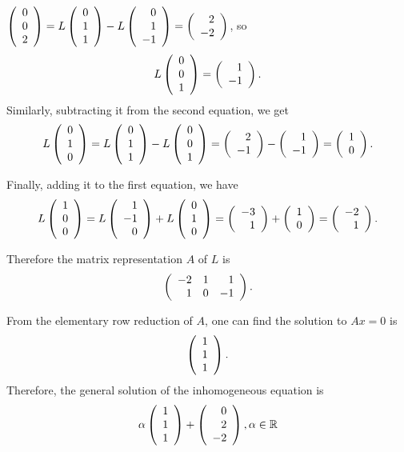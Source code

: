 \documentclass{ximera}
\begin{document}
\begin{exercise}
\begin{solution}
\begin{enumeratea}
\end{enumeratea}



\soln 

\begin{enumeratea}
\item  $\Matrix{ 0\\0\\2 }=L\Matrix{ 0\\1\\1}-L\Matrix{0\\1\\-1}=\Matrix{2\\-2 }$, so 
\[
L\Matrix{0\\0\\1}=\Matrix{1\\-1}.
\]
Similarly, subtracting it from the second equation, we get 
\[
L\Matrix{0\\1\\0}=L\Matrix{ 0\\1\\1}-L\Matrix{0\\0\\1}=\Matrix{2\\-1}-\Matrix{1\\-1}=\Matrix{1\\0 }.
\]

Finally, adding it to the first equation, we have 
\[
L\Matrix{1\\0\\0}=L\Matrix{1\\-1\\0}+L\Matrix{0\\1\\0}=\Matrix{ -3\\1}+\Matrix{1\\0}=\Matrix{-2\\1}.
\]

Therefore the matrix representation $A$ of $L$ is 
\[
\Matrix{ -2&1&1\\1&0&-1}.
\]

\item {}

\item From the elementary row reduction of $A$, one can find the solution to $Ax=0$ is 
\[
\Matrix{1\\1\\1}.
\]
Therefore, the general solution of the inhomogeneous equation is 
\[
\alpha \Matrix{1\\1\\1}+\Matrix{0\\2\\-2}, \alpha\in \mathbb R
\]
\end{enumeratea}



\end{solution}
\end{exercise}
\end{document}
